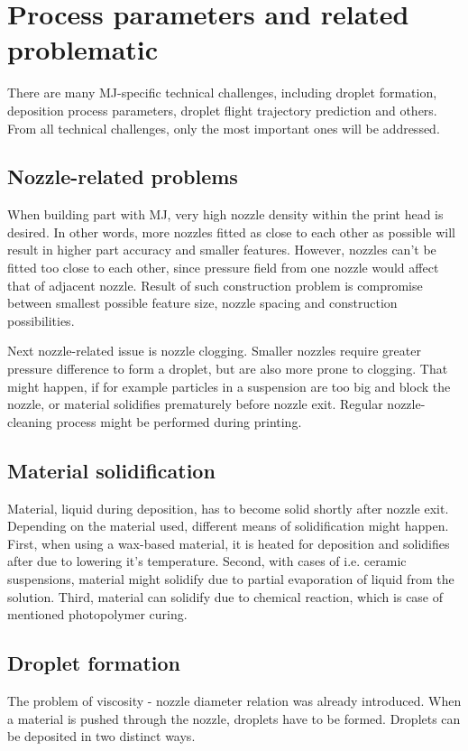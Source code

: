 \documentclass[a4paper, twoside, 11pt]{report}
\begin{document}
\section{Process parameters and related problematic}
There are many MJ-specific technical challenges, including droplet formation, deposition process parameters, droplet flight trajectory prediction and others. From all technical challenges, only the most important ones will be addressed.

\subsection{Nozzle-related problems}
When building part with MJ, very high nozzle density within the print head is desired. In other words, more nozzles fitted as close to each other as possible will result in higher part accuracy and smaller features. However, nozzles can't be fitted too close to each other, since pressure field from one nozzle would affect that of adjacent nozzle. Result of such construction problem is compromise between smallest possible feature size, nozzle spacing and construction possibilities.

	Next nozzle-related issue is nozzle clogging. Smaller nozzles require greater pressure difference to form a droplet, but are also more prone to clogging. That might happen, if for example particles in a suspension are too big and block the nozzle, or material solidifies prematurely before nozzle exit. Regular nozzle-cleaning process might be performed during printing.

\subsection{Material solidification}
Material, liquid during deposition, has to become solid shortly after nozzle exit. Depending on the material used, different means of solidification might happen. First, when using a wax-based material, it is heated for deposition and solidifies after due to lowering it's temperature. Second, with cases of i.e. ceramic suspensions, material might solidify due to partial evaporation of liquid from the solution. Third, material can solidify due to chemical reaction, which is case of  mentioned photopolymer curing.

\subsection{Droplet formation}
The problem of viscosity - nozzle diameter relation was already introduced. When a material is pushed through the nozzle, droplets have to be formed. Droplets can be deposited in two distinct ways.
\end{document}
